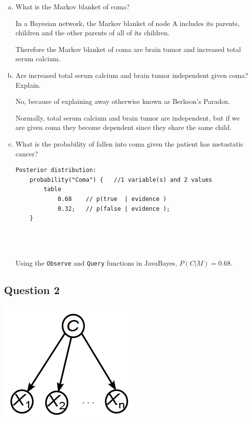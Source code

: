\documentclass{article}
\renewcommand{\tt}{\texttt}
\begin{document}
\begin{enumerate}[a)]
\item What is the Markov blanket of coma?

In a Bayesian network, the Markov blanket of node A includes its parents, children and the other parents of all of its children.

Therefore the Markov blanket of coma are brain tumor and increased total serum calcium.

\item Are increased total serum calcium and brain tumor independent given coma? Explain.

No, because of explaining away otherwise known as Berkson's Paradox.

Normally, total serum calcium and brain tumor are independent, but if we are given coma they become dependent since they share the same child.

\item What is the probability of fallen into coma given the patient has metastatic cancer? 

\begin{minipage}{\linewidth}
\begin{lstlisting}
Posterior distribution:
	probability("Coma") {   //1 variable(s) and 2 values
		table 
			0.68	// p(true  | evidence )
			0.32; 	// p(false | evidence );
	}
\end{lstlisting}
\end{minipage}\\
\\
\\
Using the \tt{Observe} and \tt{Query} functions in JavaBayes, $P(C | M) = 0.68$.
\end{enumerate} 

\subsection{Question 2}
\begin{minipage}{\linewidth}
\begin{center}
\includegraphics[scale=0.5]{part2_nbc}
\end{center}
\end{minipage}\\
\end{document}
